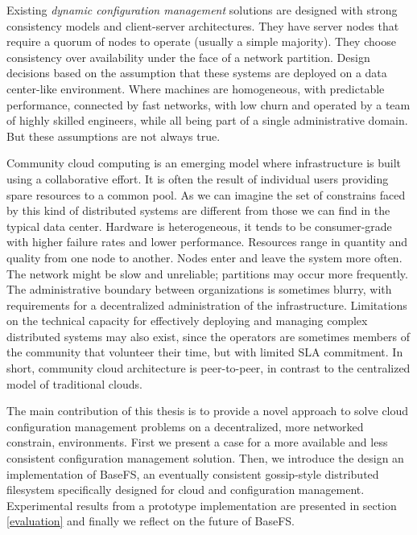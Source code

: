 \documentclass{sig-alternate}
\begin{document}
Existing \textit{dynamic configuration management} solutions are designed with strong consistency models and client-server architectures. They have server nodes that require a quorum of nodes to operate (usually a simple majority). They choose consistency over availability under the face of a network partition. Design decisions based on the assumption that these systems are deployed on a data center-like environment. Where machines are homogeneous, with predictable performance, connected by fast networks, with low churn and operated by a team of highly skilled engineers, while all being part of a single administrative domain. But these assumptions are not always true.

Community cloud computing\cite{marinos2009community} is an emerging model where infrastructure is built using a collaborative effort. It is often the result of individual users providing spare resources to a common pool. As we can imagine the set of constrains faced by this kind of distributed systems are different from those we can find in the typical data center. Hardware is heterogeneous, it tends to be consumer-grade with higher failure rates and lower performance. Resources range in quantity and quality from one node to another. Nodes enter and leave the system more often. The network might be slow and unreliable; partitions may occur more frequently. The administrative boundary between organizations is sometimes blurry, with requirements for a decentralized administration of the infrastructure. Limitations on the technical capacity for effectively deploying and managing complex distributed systems may also exist, since the operators are sometimes members of the community that volunteer their time, but with limited SLA commitment. In short, community cloud architecture is peer-to-peer\cite{babaoglupeer, ranjan2010peer}, in contrast to the centralized model of traditional clouds.

The main contribution of this thesis is to provide a novel approach to solve cloud configuration management problems on a decentralized, more networked constrain, environments. First we present a case for a more available and less consistent configuration management solution. Then, we introduce the design an implementation of BaseFS, an eventually consistent gossip-style distributed filesystem specifically designed for cloud and configuration management. Experimental results from a prototype implementation are presented in section \ref{evaluation} and finally we reflect on the future of BaseFS.
\end{document}
